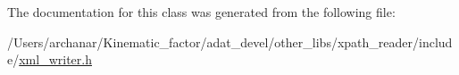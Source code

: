 The documentation for this class was generated from the following file\+:\begin{DoxyCompactItemize}
\item 
/\+Users/archanar/\+Kinematic\+\_\+factor/adat\+\_\+devel/other\+\_\+libs/xpath\+\_\+reader/include/\mbox{\hyperlink{other__libs_2xpath__reader_2include_2xml__writer_8h}{xml\+\_\+writer.\+h}}\end{DoxyCompactItemize}
